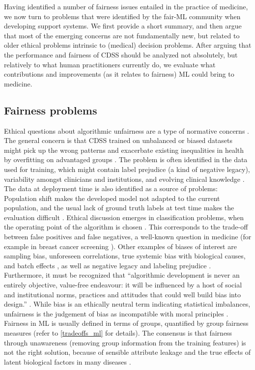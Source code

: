 Having identified a number of fairness issues entailed in the practice of medicine, we now turn to problems that were identified by the fair-ML community when developing support systems.
We first provide a short summary, and then argue that most of the emerging concerns are not fundamentally new, but related to older ethical problems intrinsic to (medical) decision problems.
After arguing that the performance and fairness of CDSS should be analyzed not absolutely, but relatively to what human practitioners currently do,
we evaluate what contributions and improvements (as it relates to fairness) ML could bring to medicine. 


\subsection{Fairness problems}
    Ethical questions about algorithmic unfairness are a type of normative concerns \cite{Morley2020}.
    The general concern is that CDSS trained on unbalanced or biased datasets might pick up the wrong patterns and exacerbate existing inequalities in health by overfitting on advantaged groups \cite{Morley2020, Chen2021}.
    The problem is often identified in the data used for training, which might contain label prejudice (a kind of negative legacy), variability amongst clinicians and institutions, and evolving clinical knowledge \cite{Chen2021}.
    The data at deployment time is also identified as a source of problems: Population shift makes the developed model not adapted to the current population, and the usual lack of ground truth labels at test time makes the evaluation difficult \cite{Chen2021}.
    Ethical discussion emerges in classification problems, when the operating point of the algorithm is chosen \cite{Fletcher2021}.
    This corresponds to the trade-off between false positives and false negatives, a well-known question in medicine (for example in breast cancer screening \cite{Fletcher2021}).
    Other examples of biases of interest are sampling bias, unforeseen correlations, true systemic bias with biological causes, and batch effects \cite{Fletcher2021}, as well as negative legacy and labeling prejudice \cite{Chen2021}.
    Furthermore, it must be recognized that ``algorithmic development is never an entirely objective, value-free endeavour: it will be influenced by a host of social and institutional norms, practices and attitudes that could well build bias into design.'' \cite[p.~673]{Zerilli2019}.
    While bias is an ethically neutral term indicating statistical imbalances, unfairness is the judgement of bias as incompatible with moral principles \cite{Fletcher2021}.
    Fairness in ML is usually defined in terms of groups, quantified by group fairness measures (refer to \ref{tradeoffs_ml} for details).
    The consensus is that fairness through unawareness (removing group information from the training features) is not the right solution, because of sensible attribute leakage and the true effects of latent biological factors in many diseases \cite{Chen2021}.



